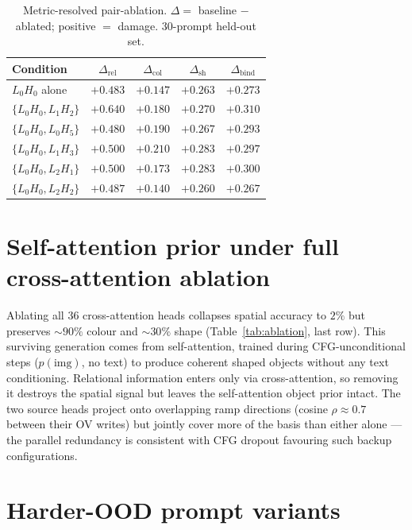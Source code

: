 \documentclass{article}
\theoremstyle{plain}
\theoremstyle{definition}
\begin{document}
\begin{table}[h]
\centering
\small
\caption{Metric-resolved pair-ablation. $\Delta = $ baseline $-$ ablated; positive $=$ damage. $30$-prompt held-out set.}
\label{tab:pair-ablation-resolved}
\begin{tabular}{lcccc}
\toprule
Condition & $\Delta_\text{rel}$ & $\Delta_\text{col}$ & $\Delta_\text{sh}$ & $\Delta_\text{bind}$ \\
\midrule
$L_0H_0$ alone     & $+0.483$ & $+0.147$ & $+0.263$ & $+0.273$ \\
$\{L_0H_0, L_1H_2\}$ & $+0.640$ & $+0.180$ & $+0.270$ & $+0.310$ \\
$\{L_0H_0, L_0H_5\}$ & $+0.480$ & $+0.190$ & $+0.267$ & $+0.293$ \\
$\{L_0H_0, L_1H_3\}$ & $+0.500$ & $+0.210$ & $+0.283$ & $+0.297$ \\
$\{L_0H_0, L_2H_1\}$ & $+0.500$ & $+0.173$ & $+0.283$ & $+0.300$ \\
$\{L_0H_0, L_2H_2\}$ & $+0.487$ & $+0.140$ & $+0.260$ & $+0.267$ \\
\bottomrule
\end{tabular}
\end{table}

\section{Self-attention prior under full cross-attention ablation}
\label{app:cfg-prior}

Ablating all 36 cross-attention heads collapses spatial accuracy to $2\%$ but preserves $\sim\!90\%$ colour and $\sim\!30\%$ shape (Table~\ref{tab:ablation}, last row). This surviving generation comes from self-attention, trained during CFG-unconditional steps ($p(\text{img})$, no text) to produce coherent shaped objects without any text conditioning. Relational information enters only via cross-attention, so removing it destroys the spatial signal but leaves the self-attention object prior intact. The two source heads project onto overlapping ramp directions (cosine $\rho\!\approx\!0.7$ between their OV writes) but jointly cover more of the basis than either alone --- the parallel redundancy is consistent with CFG dropout favouring such backup configurations.

\section{Harder-OOD prompt variants}
\label{app:harder-ood}
\end{document}
